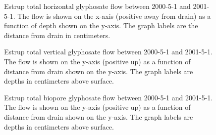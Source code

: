 \begin{figure}[htbp]
  \centering
  
  \caption{Estrup total horizontal glyphosate flow between 2000-5-1 and
    2001-5-1.  The flow is shown on the x-axis (positive away from
    drain) as a function of depth shown on the y-axis.  The graph
    labels are the distance from drain in centimeters.}
  \label{fig:Estrup-Glyphosate-2000-horizontal}
\end{figure}\FloatBarrier

\begin{figure}[htbp]
  \centering
  
  \caption{Estrup total vertical glyphosate flow between 2000-5-1 and
    2001-5-1.  The flow is shown on the y-axis (positive up) as a
    function of distance from drain shown on the y-axis.  The graph
    labels are depths in centimeters above surface.}
  \label{fig:Estrup-Glyphosate-2000}
\end{figure}\FloatBarrier

\begin{figure}[htbp]
  \centering
  
  \caption{Estrup total biopore glyphosate flow between 2000-5-1 and
    2001-5-1.  The flow is shown on the y-axis (positive up) as a
    function of distance from drain shown on the y-axis.  The graph
    labels are depths in centimeters above surface.}
  \label{fig:Estrup-Glyphosate-biopore-2000}
\end{figure}\FloatBarrier

